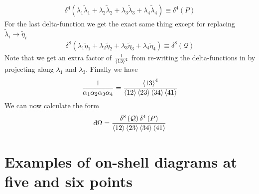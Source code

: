 \documentclass[letter,11pt]{article}
\begin{document}
\begin{equation}
	\begin{aligned}
		\delta^{4}(\lambda_1\tilde\lambda_1+\lambda_2\tilde\lambda_2+\lambda_3\tilde\lambda_3+\lambda_4\tilde\lambda_4)\equiv \delta^{4}\left(P\right)
	\end{aligned}
\end{equation}
For the last delta-function we get the exact same thing except for replacing $\tilde \lambda_i\to \tilde \eta_i$
\begin{equation}
	\begin{aligned}
		\delta^{8}(\lambda_1\tilde\eta_1+\lambda_2\tilde\eta_2+\lambda_3\tilde\eta_3+\lambda_4\tilde\eta_4)\equiv \delta^{8}\left(\mathcal{Q}\right)
	\end{aligned}
\end{equation}
Note that we get an extra factor of $\frac{1}{\expval{13}^4}$ from re-writing the delta-functions in by projecting along $\lambda_1$ and $\lambda_3$.
 Finally we have
\begin{equation}
	\begin{aligned}
		\frac{1}{\alpha_1 \alpha_2 \alpha_3 \alpha_4}=\frac{\expval{13}^4}{\expval{12}\expval{23}\expval{34}\expval{41}}
	\end{aligned}
\end{equation}
We can now calculate the form
\begin{equation}
	\begin{aligned}
		\dd \Omega =
		\frac{\delta^{8}\left(\mathcal{Q}\right)\delta^{4}\left(P\right)}{\expval{12}\expval{23}\expval{34}\expval{41}}
	\end{aligned}
\end{equation}
\section{Examples of on-shell diagrams at five and six points}
\end{document}
